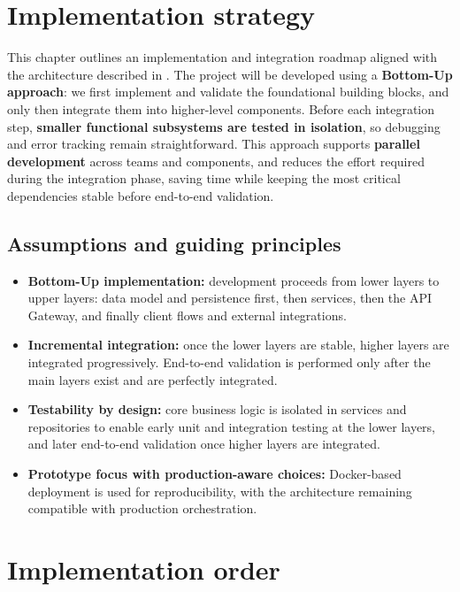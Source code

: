 \section{Implementation strategy}
\label{sec:implementation_strategy}%

This chapter outlines an implementation and integration roadmap aligned with the architecture described in . The project will be developed using a \textbf{Bottom-Up approach}: we first implement and validate the foundational building blocks, and only then integrate them into higher-level components. Before each integration step, \textbf{smaller functional subsystems are tested in isolation}, so debugging and error tracking remain straightforward. This approach supports \textbf{parallel development} across teams and components, and reduces the effort required during the integration phase, saving time while keeping the most critical dependencies stable before end-to-end validation.

\subsection{Assumptions and guiding principles}
\label{subsec:impl_assumptions}%

\begin{itemize}
    \item \textbf{Bottom-Up implementation:} development proceeds from lower layers to upper layers: data model and persistence first, then services, then the API Gateway, and finally client flows and external integrations.
    \item \textbf{Incremental integration:} once the lower layers are stable, higher layers are integrated progressively. End-to-end validation is performed only after the main layers exist and are perfectly integrated.
    \item \textbf{Testability by design:} core business logic is isolated in services and repositories to enable early unit and integration testing at the lower layers, and later end-to-end validation once higher layers are integrated.
    \item \textbf{Prototype focus with production-aware choices:} Docker-based deployment is used for reproducibility, with the architecture remaining compatible with production orchestration.
\end{itemize}

\section{Implementation order}
\label{sec:implementation_order}%


